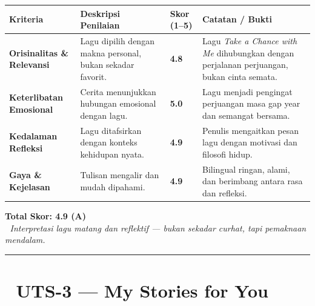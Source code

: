 \documentclass[
  letterpaper,
  DIV=11,
  numbers=noendperiod]{scrreprt}
\begin{document}
\begin{longtable}[]{@{}
  >{\raggedright\arraybackslash}p{}
  >{\raggedright\arraybackslash}p{}
  >{\raggedright\arraybackslash}p{}
  >{\raggedright\arraybackslash}p{}@{}}
\toprule\noalign{}
\begin{minipage}[b]{\linewidth}\raggedright
\textbf{Kriteria}
\end{minipage} & \begin{minipage}[b]{\linewidth}\raggedright
\textbf{Deskripsi Penilaian}
\end{minipage} & \begin{minipage}[b]{\linewidth}\raggedright
\textbf{Skor (1--5)}
\end{minipage} & \begin{minipage}[b]{\linewidth}\raggedright
\textbf{Catatan / Bukti}
\end{minipage} \\
\midrule\noalign{}
\endhead
\bottomrule\noalign{}
\endlastfoot
\textbf{Orisinalitas \& Relevansi} & Lagu dipilih dengan makna personal,
bukan sekadar favorit. & \textbf{4.8} & Lagu \emph{Take a Chance with
Me} dihubungkan dengan perjalanan perjuangan, bukan cinta semata. \\
\textbf{Keterlibatan Emosional} & Cerita menunjukkan hubungan emosional
dengan lagu. & \textbf{5.0} & Lagu menjadi pengingat perjuangan masa gap
year dan semangat bersama. \\
\textbf{Kedalaman Refleksi} & Lagu ditafsirkan dengan konteks kehidupan
nyata. & \textbf{4.9} & Penulis mengaitkan pesan lagu dengan motivasi
dan filosofi hidup. \\
\textbf{Gaya \& Kejelasan} & Tulisan mengalir dan mudah dipahami. &
\textbf{4.9} & Bilingual ringan, alami, dan berimbang antara rasa dan
refleksi. \\
\end{longtable}

\textbf{Total Skor: 4.9 (A)}\\
📝 \emph{Interpretasi lagu matang dan reflektif --- bukan sekadar
curhat, tapi pemaknaan mendalam.}

\begin{center}\rule{0.5\linewidth}{0.5pt}\end{center}

\section{📖 UTS-3 --- My Stories for
You}\label{uts-3-my-stories-for-you-1}
\end{document}
